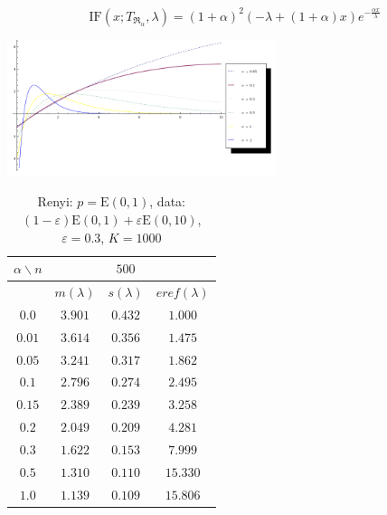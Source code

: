 \documentclass[11pt,a4paper]{beamer}
\begin{document}

\begin{frame}
	\begin{equation*}
		\mathrm{IF}(x;T_{\mathfrak{R}_\alpha},\lambda) =	(1+\alpha )^2 ( - \lambda +(1+ \alpha)x) e^{-\frac{\alpha x}{\lambda }}
	\end{equation*}
	\begin{center}
		\includegraphics[width = 3.1in]{IF-Exponential-sigma.png}			
	\end{center}
\end{frame}

\begin{frame}
\begin{table}[ht] \footnotesize
\begin{center} 
\begin{tabular}{|c|ccc|} 
\hline 
$\alpha\backslash n$ && $500$ & \\ 
\hline 
& $m(\lambda)$ & $s(\lambda)$ & $eref(\lambda)$ \\ 
\hline 
$0.0$ & $ 3.901 $ & $ 0.432 $ & $ 1.000 $\\ 
\hline 
$0.01$ &$ 3.614 $ & $ 0.356 $ & $ 1.475 $\\ 
\hline 
$0.05$ & $ 3.241 $ & $ 0.317 $ & $ 1.862 $\\ 
\hline 
$0.1$ & $ 2.796 $ & $ 0.274 $ & $ 2.495 $\\ 
\hline 
$0.15$ & $ 2.389 $ & $ 0.239 $ & $ 3.258 $\\ 
\hline 
$0.2$ &$ 2.049 $ & $ 0.209 $ & $ 4.281 $\\ 
\hline 
$0.3$ & $ 1.622 $ & $ 0.153 $ & $ 7.999 $\\ 
\hline 
$0.5$ &  $ 1.310 $ & $ 0.110 $ & $ 15.330 $\\ 
\hline 
$1.0$ &  $ 1.139 $ & $ 0.109 $ & $ 15.806 $\\ 
\hline 
\end{tabular}
\caption{Renyi: $p = \mathrm{E}(0,1)$, data: $(1-\varepsilon)\mathrm{E}(0,1) + \varepsilon \mathrm{E}(0,10)$, $\varepsilon =  0.3$, $K = 1000$} 
\end{center}
\end{table}
\end{frame}
\end{document}
